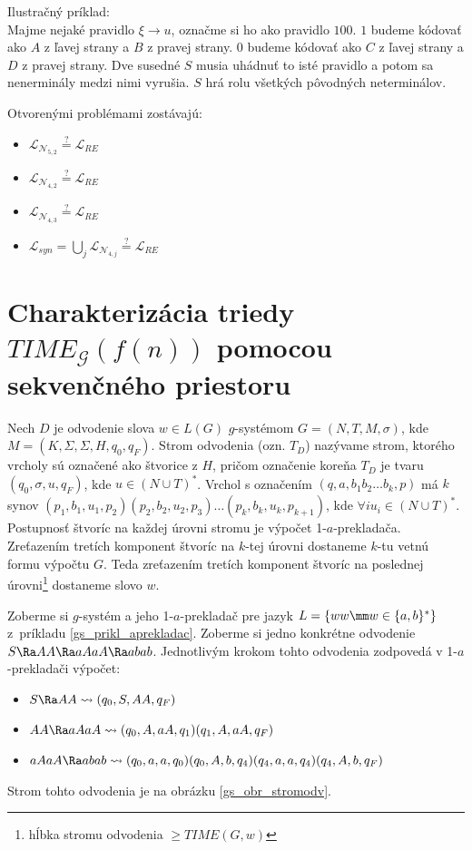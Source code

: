 Ilustračný príklad:\\
Majme nejaké pravidlo $\xi \to u$, označme si ho ako pravidlo $100$.
$1$ budeme kódovať ako $A$ z ľavej strany a $B$ z pravej strany.
$0$ budeme kódovať ako $C$ z ľavej strany a $D$ z pravej strany.
Dve susedné $S$ musia uhádnuť to isté pravidlo a potom sa nenerminály medzi nimi vyrušia.
$S$ hrá rolu všetkých pôvodných neterminálov.

Otvorenými problémami zostávajú:
\begin{itemize}
  \item $\mathcal{L}_{\mathcal{N}_{5,2}}\overset{?}{=}\mathcal{L}_{RE}$
  \item $\mathcal{L}_{\mathcal{N}_{4,2}}\overset{?}{=}\mathcal{L}_{RE}$
  \item $\mathcal{L}_{\mathcal{N}_{4,3}}\overset{?}{=}\mathcal{L}_{RE}$
  \item $\mathcal{L}_{syn}=\bigcup_j\mathcal{L}_{\mathcal{N}_{4,j}}\overset{?}{=}\mathcal{L}_{RE}$
\end{itemize}

\section{Charakterizácia triedy $TIME_{\mathcal{G}}(f(n))$ pomocou
sek\-venč\-ného priestoru}

\begin{definicia}
Nech $D$ je odvodenie slova $w\in L(G)$ $g$-systémom
$G=(N,T,M,\sigma)$, kde $M=(K,\Sigma,\Sigma,H,q_0,q_F)$. Strom
odvodenia (ozn. $T_D$) nazývame strom, ktorého vrcholy sú označené
ako štvorice z $H$, pričom označenie koreňa $T_D$ je tvaru
$(q_0,\sigma,u,q_F)$, kde $u\in (N\cup T)^*$. Vrchol s označením
$(q,a,b_1b_2\dots b_k,p)$ má $k$ synov $(p_1,b_1,u_1,p_2)
(p_2,b_2,u_2,p_3)\dots(p_k,b_k,u_k,p_{k+1})$, kde $\forall i
u_i\in (N\cup T)^*$. Postupnosť štvoríc na každej úrovni stromu je
výpočet 1-$a$-prekladača. Zreťazením tretích komponent štvoríc na
$k$-tej úrovni dostaneme $k$-tu vetnú formu výpočtu $G$. Teda
zreťazením tretích komponent štvoríc na poslednej
úrovni\footnote{hĺbka stromu odvodenia $\geq TIME(G,w)$} dostaneme
slovo $w$.
\end{definicia}

\begin{priklad}
Zoberme si $g$-systém a jeho 1-$a$-prekladač pre jazyk $L=\{ww\mm
w\in\{a,b\}^* \}$ \mbox{z príkladu} \ref{gs_prikl_aprekladac}. Zoberme si
jedno konkrétne odvodenie $S\Ra AA\Ra aAaA\Ra abab$. Jednotlivým
krokom tohto odvodenia zodpovedá v 1-$a$-prekladači výpočet:
\begin{itemize}
  \item $S\Ra AA\rightsquigarrow (q_0,S,AA,q_F)$
  \item $AA\Ra aAaA\rightsquigarrow (q_0,A,aA,q_1)(q_1,A,aA,q_F)$
  \item $aAaA\Ra abab\rightsquigarrow
  (q_0,a,a,q_0)(q_0,A,b,q_4)(q_4,a,a,q_4)(q_4,A,b,q_F)$
\end{itemize}
Strom tohto odvodenia je na obrázku \ref{gs_obr_stromodv}.
\end{priklad}

